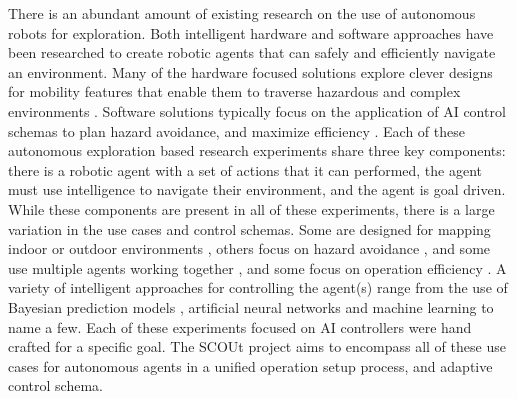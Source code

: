 There is an abundant amount of existing research on the use of autonomous robots for exploration.
Both intelligent hardware and software approaches have been researched to create robotic agents that can safely and efficiently navigate an environment.
Many of the hardware focused solutions explore clever designs for mobility features that enable them to traverse hazardous and complex environments .
Software solutions typically focus on the application of AI control schemas to plan hazard avoidance, and maximize efficiency \cite{christensen_multi-robot_2017, tai_autonomous_2017, stachniss_exploration_2004, clark_mobile_2007, perea_strom_robust_2017, fink_tier-scalable_2007, bai_toward_2017}.
Each of these autonomous exploration based research experiments share three key components: there is a robotic agent with a set of actions that it can performed, the agent must use intelligence to navigate their environment, and the agent is goal driven.
While these components are present in all of these experiments, there is a large variation in the use cases and control schemas.
Some are designed for mapping indoor or outdoor environments \cite{tai_autonomous_2017,  stachniss_exploration_2004, perea_strom_robust_2017}, others focus on hazard avoidance \cite{christensen_multi-robot_2017, fink_tier-scalable_2007}, and some use multiple agents working together \cite{christensen_multi-robot_2017, clark_mobile_2007}, and some focus on operation efficiency \cite{bai_toward_2017}.
A variety of intelligent approaches for controlling the agent(s) range from the use of Bayesian prediction models \cite{christensen_multi-robot_2017}, artificial neural networks \cite{tai_autonomous_2017} and machine learning \cite{bai_toward_2017} to name a few.
Each of these experiments focused on AI controllers were hand crafted for a specific goal.
The SCOUt project aims to encompass all of these use cases for autonomous agents in a unified operation setup process, and adaptive control schema.

